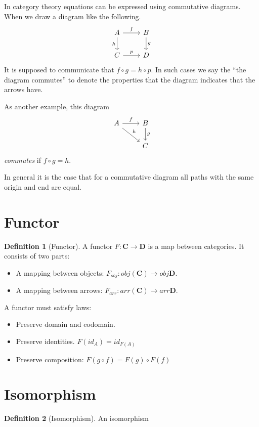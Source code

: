 \documentclass{article}
\theoremstyle{definition}
\newtheorem{definition}{Definition}[section]
\newcommand{\arr}[3]{#1 : #2 \rightarrow #3}
\newcommand\id{\mathit{id}}
\begin{document}
In category theory equations can be expressed using commutative diagrams. When
we draw a diagram like the following.
\[
\begin{tikzcd}
  A \arrow[r, "f"] \arrow[d, "h"']
  & B \arrow[d, "g"] \\
  C \arrow[r, "p"] & D
\end{tikzcd}
\]
It is supposed to communicate that $f \circ g = h \circ p$. In such cases we say
the ``the diagram commutes'' to denote the properties that the diagram indicates
that the arrows have.

As another example, this diagram
\[
  \begin{tikzcd}
    A \arrow[r, "f"] \arrow[dr, "h"] & B \arrow[d, "g"] \\
                                     & C
  \end{tikzcd}
\]
\emph{commutes} if $f \circ g = h$.

In general it is the case that for a commutative diagram all paths with the same
origin and end are equal.

\section{Functor}

\begin{definition}[Functor]
  A functor $\arr{F}{\mathbf{C}}{\mathbf{D}}$ is a map between categories. It
  consists of two parts:
  \begin{itemize}
    \item A mapping between objects: $\arr{F_{obj}}{obj(\mathbf{C})}{obj\mathbf{D}}$.
    \item A mapping between arrows: $\arr{F_{arr}}{arr(\mathbf{C})}{arr\mathbf{D}}$.
  \end{itemize}
  A functor must satisfy laws:
  \begin{itemize}
    \item Preserve domain and codomain.
    \item Preserve identities. $F(\id_A) = \id_{F(A)}$
    \item Preserve composition: $F(g \circ f) = F(g) \circ F(f)$
  \end{itemize}
\end{definition}

\section{Isomorphism}

\begin{definition}[Isomorphism]
  An isomorphism
\end{definition}
\end{document}
